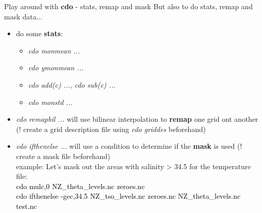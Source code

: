 \begin{frame}{\insertsectionnumber{ |} Play around with \textbf{cdo} - stats, remap and mask}
    But also to do stats, remap and mask data...\\
        \vspace{0.3cm}
    \begin{itemize}
        \item do some \textbf{stats}: 
            \vspace{0.2cm}
            \begin{itemize}
                \item \textit{cdo monmean ...}
                    \vspace{0.2cm}
                \item \textit{cdo ymonmean ...}
                    \vspace{0.2cm}
                \item \textit{cdo add(c) ...}, \textit{cdo sub(c) ...}
                    \vspace{0.2cm}            
                \item \textit{cdo monstd ...}
                    \vspace{0.2cm}
            \end{itemize}
        \item\textit{cdo remapbil ...} will use bilinear interpolation to \textbf{remap} one grid ont another (! create a grid description file using \textit{cdo griddes} beforehand)\\
            \vspace{0.5cm}
        \item\textit{cdo ifthenelse ...} will use a condition to determine if the \textbf{mask} is used (! create a mask file beforehand) \\
            \vspace{0.3cm}
            example: Let's mask out the areas with salinity > 34.5 for the temperature file:\\
                \vspace{0.3cm}
            \textcolor{black}{cdo mulc,0 NZ\_theta\_levels.nc zeroes.nc \\
            cdo ifthenelse -gec,34.5 NZ\_tso\_levels.nc zeroes.nc NZ\_theta\_levels.nc  test.nc}\\
                \vspace{0.5cm}
    \end{itemize}
\end{frame}


